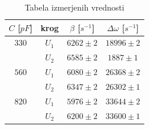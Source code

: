\documentclass[12pt]{article}
\begin{document}
\begin{table}[!ht]
\centering
\begin{tabular}{c|c|c|c}
    $C$ [$pF$] & krog & $\beta$ [$s^{-1}$] & $\Delta  \omega$ [$s^{-1}$] \\\hline \hline

    $330$ & $U_1$ & $6262 \pm 2$ & $18996 \pm 2$\\
    & $U_2$ & $6585\pm 2$ & $1887 \pm 1$\\
    $560$ & $U_1$ & $6080\pm 2$ & $26368\pm 2$\\
    & $U_2$ & $6347\pm 2$ & $26302\pm 1$\\
    $820$ & $U_1$ & $5976\pm 2$ & $33644\pm 2$\\
    & $U_2$ & $6200\pm 2$ & $33600\pm 1$\\
\end{tabular}
\caption{Tabela izmerjenih vrednosti}
\end{table}
\end{document}
